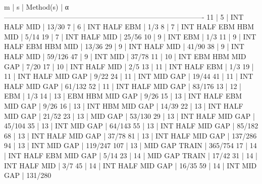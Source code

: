  m    |   s    |                   Method(s)                  |        α         
-------------------------------------------------------------------------------------   
11    |  5     |        INT  HALF            MID              | 13/30   
7     |  6     |        INT  HALF  EBM                        | 1/3   
8     |  7     |        INT  HALF  EBM  HBM  MID              | 5/14   
19    |  7     |        INT  HALF            MID              | 25/56   
10    |  9     |        INT        EBM                        | 1/3   
11    |  9     |        INT  HALF  EBM  HBM  MID              | 13/36   
29    |  9     |        INT  HALF            MID              | 41/90   
38    |  9     |        INT  HALF            MID              | 59/126   
47    |  9     |        INT                  MID              | 37/78   
11    |  10    |        INT        EBM  HBM  MID  GAP         | 7/20   
17    |  10    |        INT  HALF            MID              | 2/5   
13    |  11    |        INT  HALF  EBM                        | 1/3   
19    |  11    |        INT  HALF            MID  GAP         | 9/22   
24    |  11    |        INT                  MID  GAP         | 19/44   
41    |  11    |        INT  HALF            MID  GAP         | 61/132   
52    |  11    |        INT  HALF            MID  GAP         | 83/176   
13    |  12    |                   EBM                        | 1/3   
14    |  13    |                   EBM  HBM  MID  GAP         | 9/26   
15    |  13    |        INT  HALF  EBM       MID  GAP         | 9/26   
16    |  13    |        INT             HBM  MID  GAP         | 14/39   
22    |  13    |        INT  HALF            MID  GAP         | 21/52   
23    |  13    |                             MID  GAP         | 53/130   
29    |  13    |        INT  HALF            MID  GAP         | 45/104   
35    |  13    |        INT                  MID  GAP         | 64/143   
55    |  13    |        INT  HALF            MID  GAP         | 85/182   
68    |  13    |        INT  HALF            MID  GAP         | 37/78   
81    |  13    |        INT  HALF            MID  GAP         | 137/286   
94    |  13    |        INT                  MID  GAP         | 119/247   
107   |  13    |                             MID  GAP  TRAIN  | 365/754   
17    |  14    |        INT  HALF  EBM       MID  GAP         | 5/14   
23    |  14    |                             MID  GAP  TRAIN  | 17/42   
31    |  14    |        INT  HALF            MID              | 3/7   
45    |  14    |        INT  HALF            MID  GAP         | 16/35   
59    |  14    |        INT                  MID  GAP         | 131/280   
